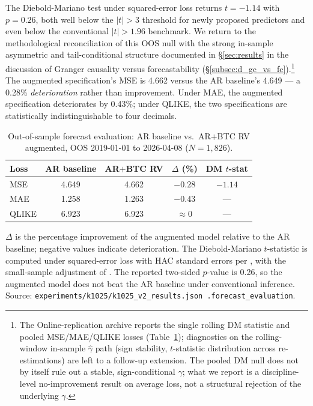 \documentclass[11pt,a4paper]{article}
\begin{document}
The Diebold-Mariano test under squared-error loss returns $t = -1.14$ with $p = 0.26$, both well below the \citet{harvey2016} $|t| > 3$ threshold for newly proposed predictors and even below the conventional $|t| > 1.96$ benchmark. We return to the methodological reconciliation of this OOS null with the strong in-sample asymmetric and tail-conditional structure documented in \S\ref{sec:results} in the discussion of Granger causality versus forecastability (\S\ref{subsec:d_gc_vs_fc}).\footnote{The Online-replication archive reports the single rolling DM statistic and pooled MSE/MAE/QLIKE losses (Table~\ref{tab:oos}); diagnostics on the rolling-window in-sample $\hat\gamma$ path (sign stability, $t$-statistic distribution across re-estimations) are left to a follow-up extension. The pooled DM null does not by itself rule out a stable, sign-conditional $\gamma$; what we report is a discipline-level no-improvement result on average loss, not a structural rejection of the underlying $\gamma$.}%
 The augmented specification's MSE is 4.662 versus the AR baseline's 4.649 --- a 0.28\% \emph{deterioration} rather than improvement. Under MAE, the augmented specification deteriorates by 0.43\%; under QLIKE, the two specifications are statistically indistinguishable to four decimals.

\begin{table}[H]
\centering
\caption{Out-of-sample forecast evaluation: AR baseline vs.\ AR$+$BTC RV augmented, OOS 2019-01-01 to 2026-04-08 ($N = 1{,}826$).}
\label{tab:oos}
\begin{tabular}{lcccc}
\toprule
Loss & AR baseline & AR$+$BTC RV & $\Delta$ (\%) & DM $t$-stat \\
\midrule
MSE   & 4.649 & 4.662 & $-0.28$ & $-1.14$ \\
MAE   & 1.258 & 1.263 & $-0.43$ & --- \\
QLIKE & 6.923 & 6.923 & $\approx 0$ & --- \\
\bottomrule
\end{tabular}
\begin{flushleft}
\footnotesize $\Delta$ is the percentage improvement of the augmented model relative to the AR baseline; negative values indicate deterioration. The Diebold-Mariano $t$-statistic is computed under squared-error loss with HAC standard errors per \citet{diebold1995}, with the small-sample adjustment of \citet{harvey1997}. The reported two-sided $p$-value is 0.26, so the augmented model does not beat the AR baseline under conventional inference. Source: \texttt{experiments/k1025/k1025\_v2\_results.json .forecast\_evaluation}.
\end{flushleft}
\end{table}
\end{document}
